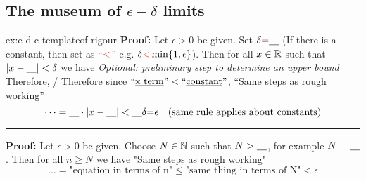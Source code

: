\documentclass[landscape, 8pt]{extarticle}
\begin{document}
\begin{multicols}{3}
\subsection*{The museum of $\epsilon-\delta$ limits}

\begin{xmp}{ex:e-d-c-template}{of rigour}
    \textbf{Proof:} Let $\epsilon > 0$ be given. Set $\delta {\color{colour1}=}\text{\underline{\quad}}$ (If there is a constant, then set as ``${\color{colour1}<}$'' e.g. $\delta {\color{colour1}<}\min\{1,\epsilon\}$). Then for all $x\in \mathbb{R}$ such that $\lvert x - \text{\underline{\quad}}\rvert < \delta$ we have
    \vspace{0pt}\newline
    \textit{Optional: preliminary step to determine an upper bound}
    \vspace{0pt}\newline
    Therefore, / Therefore since $\text{``\underline{x term}''} < \text{``\underline{constant}''}$,
    \vspace{0pt}\newline
    ``Same steps as rough working''
    \[\dots = \text{\underline{\quad}} \cdot \lvert x - \text{\underline{\quad}}\rvert < \text{\underline{\quad}}\delta {\color{colour1}=} \epsilon \quad\text{(same rule applies about constants)}\]
    \hrule
    \vspace{3pt}
    \noindent\textbf{Proof:} Let $\epsilon>0$ be given. Choose $N\in \mathbb{N}$ such that $N > \text{\underline{\quad}}$, for example $N=\text{\underline{\quad}}$. Then for all $n\ge N$ we have
    \vspace{0pt}\newline
    "Same steps as rough working"
    \[\dots = \text{"equation in terms of n"} \le \text{"same thing in terms of N"} < \epsilon\]
\end{xmp}
\vspace{-5pt}


\end{multicols}
\end{document}
